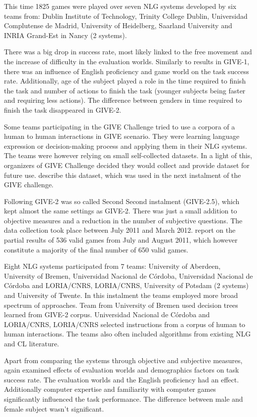 This time 1825 games were played over seven NLG systems developed by six teams from: Dublin Institute of Technology, Trinity College Dublin, Universidad Complutense de Madrid, University of Heidelberg, Saarland University and INRIA Grand-Est in Nancy (2 systems).

There was a big drop in success rate, most likely linked to the free movement and the increase of difficulty in the evaluation worlds. Similarly to results in GIVE-1, there was an influence of English proficiency and game world on the task success rate. Additionally, age of the subject played a role in the time required to finish the task and number of actions to finish the task (younger subjects being faster and requiring less actions). The difference between genders in time required to finish the task disappeared in GIVE-2.

Some teams participating in the GIVE Challenge tried to use a corpora of a human to human interactions in GIVE scenario. They were learning language expression or decision-making process and applying them in their NLG systems. The teams were however relying on small self-collected datasets. In a light of this, organizers of GIVE Challenge decided they would collect and provide dataset for future use. \citet{gargett2010give} describe this dataset, which was used in the next instalment of the GIVE challenge.

Following GIVE-2 was so called Second Second instalment (GIVE-2.5), which kept almost the same settings as GIVE-2. There was just a small addition to objective measures and a reduction in the number of subjective questions. The data collection took place between July 2011 and March 2012. \citet{striegnitz2011report} report on the partial results of 536 valid games from July and August 2011, which however constitute a majority of the final number of 650 valid games.

Eight NLG systems participated from 7 teams: University of Aberdeen, University of Bremen, Universidad Nacional de Córdoba, Universidad Nacional de Córdoba and LORIA/CNRS, LORIA/CNRS, University of Potsdam (2 systems) and University of Twente. In this instalment the teams employed more broad spectrum of approaches. Team from University of Bremen used decision trees learned from GIVE-2 corpus. Universidad Nacional de Córdoba and LORIA/CNRS, LORIA/CNRS selected instructions from a corpus of human to human interactions. The teams also often included algorithms from existing NLG and CL literature.

Apart from comparing the systems through objective and subjective measures, \citet{striegnitz2011report} again examined effects of evaluation worlds and demographics factors on task success rate. The evaluation worlds and the English proficiency had an effect. Additionally computer expertise and familiarity with computer games significantly influenced the task performance. The difference between male and female subject wasn't significant.

